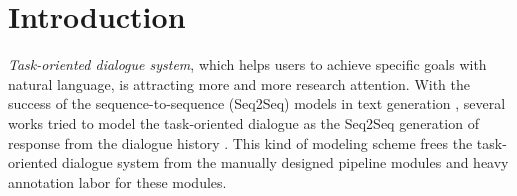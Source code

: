 \documentclass[11pt,a4paper]{article}
\begin{document}
\section{Introduction}
	\textit{Task-oriented dialogue system}, which helps users to achieve specific goals with natural language,
is attracting more and more research attention.
With the success of the sequence-to-sequence (Seq2Seq) models 
in text generation \cite{sutskever2014sequence,bahdanau2014neural,luong-pham-manning:2015:EMNLP,K16-1028,nallapati2016sequence},
several works tried to model the task-oriented dialogue as the Seq2Seq generation of response
from the dialogue history \cite{eric-manning:2017:EACL,eric:2017:SIGDial,madotto2018mem2seq}.
This kind of modeling scheme frees the task-oriented dialogue system from
the manually designed pipeline modules 
and heavy annotation labor for these modules.
\end{document}
